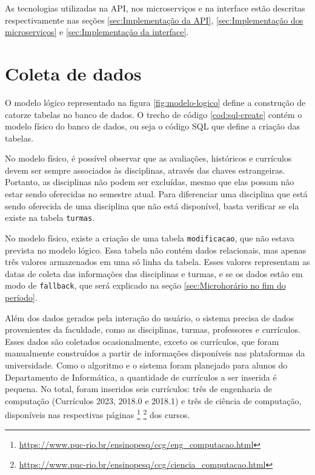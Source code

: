 As tecnologias utilizadas na API, nos microserviços e na interface estão descritas respectivamente nas seções \ref{sec:Implementação da API}, \ref{sec:Implementação dos microserviços} e \ref{sec:Implementação da interface}.

\section{Coleta de dados}
\label{sec:Coleta de dados}

O modelo lógico representado na figura \ref{fig:modelo-logico} define a construção de catorze tabelas no banco de dados. O trecho de código \ref{cod:sql-create} contém o modelo físico do banco de dados, ou seja o código SQL que define a criação das tabelas.



No modelo físico, é possível observar que as avaliações, históricos e currículos devem ser sempre associados às disciplinas, através das chaves estrangeiras. Portanto, as disciplinas não podem ser excluídas, mesmo que elas possam não estar sendo oferecidas no semestre atual. Para diferenciar uma disciplina que está sendo oferecida de uma disciplina que não está disponível, basta verificar se ela existe na tabela \verb|turmas|.

No modelo físico, existe a criação de uma tabela \verb|modificacao|, que não estava prevista no modelo lógico. Essa tabela não contém dados relacionais, mas apenas três valores armazenados em uma só linha da tabela. Esses valores representam as datas de coleta das informações das disciplinas e turmas, e se os dados estão em modo de \verb|fallback|, que será explicado na seção \ref{sec:Microhorário no fim do período}.

Além dos dados gerados pela interação do usuário, o sistema precisa de dados provenientes da faculdade, como as disciplinas, turmas, professores e currículos. Esses dados são coletados ocasionalmente, exceto os currículos, que foram manualmente construídos a partir de informações disponíveis nas plataformas da universidade. Como o algoritmo e o sistema foram planejado para alunos do Departamento de Informática, a quantidade de currículos a ser inserida é pequena. No total, foram inseridos seis currículos: três de engenharia de computação (Currículos 2023, 2018.0 e 2018.1) e três de ciência de computação, disponíveis nas respectivas páginas
\footnote{\url{https://www.puc-rio.br/ensinopesq/ccg/eng_computacao.html}}
\footnote{\url{https://www.puc-rio.br/ensinopesq/ccg/ciencia_computacao.html}}
dos cursos.


